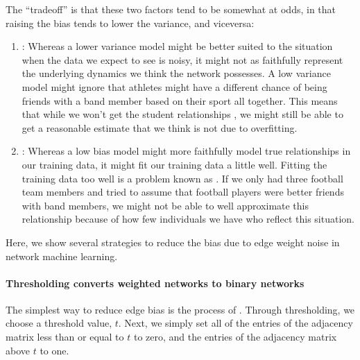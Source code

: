 \documentclass[letterpaper,10pt,english]{jupyterBook}
\begin{document}
\sphinxAtStartPar
The “trade\sphinxhyphen{}off” is that these two factors tend to be somewhat at odds, in that raising the bias tends to lower the variance, and vice\sphinxhyphen{}versa:
\begin{enumerate}
%
\item {} 
\sphinxAtStartPar
{}: Whereas a lower variance model might be better suited to the situation when the data we expect to see is noisy, it might not as faithfully represent the underlying dynamics we think the network possesses. A low variance model might ignore that athletes might have a different chance of being friends with a band member based on their sport all together. This means that while we won’t get the student relationships , we might still be able to get a reasonable estimate that we think is not due to overfitting.

\item {} 
\sphinxAtStartPar
{}: Whereas a low bias model might more faithfully model true relationships in our training data, it might fit our training data a little  well. Fitting the training data too well is a problem known as . If we only had three football team members and tried to assume that football players were better friends with band members, we might not be able to well approximate this relationship because of how few individuals we have who reflect this situation.

\end{enumerate}

\sphinxAtStartPar
Here, we show several strategies to reduce the bias due to edge weight noise in network machine learning.


\paragraph{Thresholding converts weighted networks to binary networks}
\label{\detokenize{representations/ch4/regularization:thresholding-converts-weighted-networks-to-binary-networks}}
\sphinxAtStartPar
The simplest way to reduce edge bias is the process of . Through thresholding, we choose a threshold value, \(t\). Next, we simply set all of the entries of the adjacency matrix less than or equal to \(t\) to zero, and the entries of the adjacency matrix above \(t\) to one.
\end{document}
